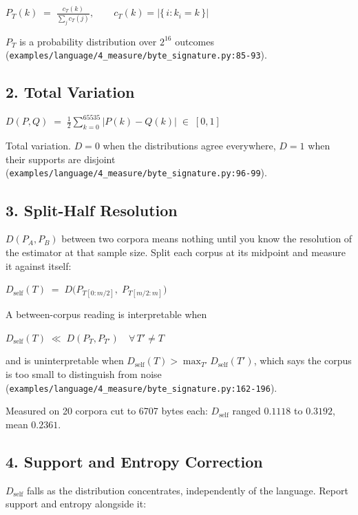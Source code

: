 \(P_T(k) \;=\; \frac{c_T(k)}{\sum_{j} c_T(j)}, \qquad c_T(k) = \bigl|\{\, i : k_i = k \,\}\bigr|\)

\(P_T\) is a probability distribution over \(2^{16}\) outcomes (\texttt{examples/\allowbreak{}language/\allowbreak{}4\_\allowbreak{}measure/\allowbreak{}byte\_\allowbreak{}signature.\allowbreak{}py:85-\allowbreak{}93}).

\subsection{2. Total Variation}

\(D(P,Q) \;=\; \tfrac{1}{2} \sum_{k=0}^{65535} \bigl| P(k) - Q(k) \bigr| \;\in\; [0,1]\)

Total variation. \(D=0\) when the distributions agree everywhere, \(D=1\) when their supports are disjoint (\texttt{examples/\allowbreak{}language/\allowbreak{}4\_\allowbreak{}measure/\allowbreak{}byte\_\allowbreak{}signature.\allowbreak{}py:96-\allowbreak{}99}).

\subsection{3. Split-Half Resolution}

\(D(P_A,P_B)\) between two corpora means nothing until you know the resolution of the estimator at that sample size. Split each corpus at its midpoint and measure it against itself:

\(D_{\text{self}}(T) \;=\; D\bigl(P_{T[0:m/2]},\; P_{T[m/2:m]}\bigr)\)

A between-corpus reading is interpretable when

\(D_{\text{self}}(T) \;\ll\; D(P_T, P_{T'}) \quad \forall\, T' \neq T\)

and is uninterpretable when \(D_{\text{self}}(T) > \max_{T'} D_{\text{self}}(T')\), which says the corpus is too small to distinguish from noise (\texttt{examples/\allowbreak{}language/\allowbreak{}4\_\allowbreak{}measure/\allowbreak{}byte\_\allowbreak{}signature.\allowbreak{}py:162-\allowbreak{}196}).

Measured on 20 corpora cut to 6707 bytes each: \(D_{\text{self}}\) ranged \(0.1118\) to \(0.3192\), mean \(0.2361\).

\subsection{4. Support and Entropy Correction}

\(D_{\text{self}}\) falls as the distribution concentrates, independently of the language. Report support and entropy alongside it:

